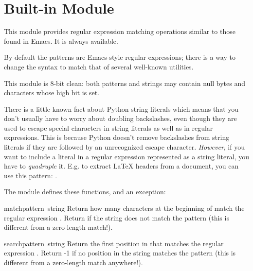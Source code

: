 \section{Built-in Module }

This module provides regular expression matching operations similar to
those found in Emacs.  It is always available.

By default the patterns are Emacs-style regular expressions; there is
a way to change the syntax to match that of several well-known
\UNIX{} utilities.

This module is 8-bit clean: both patterns and strings may contain null
bytes and characters whose high bit is set.

 There is a little-known fact about Python string
literals which means that you don't usually have to worry about
doubling backslashes, even though they are used to escape special
characters in string literals as well as in regular expressions.  This
is because Python doesn't remove backslashes from string literals if
they are followed by an unrecognized escape character.
\emph{However}, if you want to include a literal  in a
regular expression represented as a string literal, you have to
\emph{quadruple} it.  E.g.  to extract LaTeX  headers from a document, you can use this pattern:
.

The module defines these functions, and an exception:

\renewcommand{\indexsubitem}{(in module regex)}

\begin{funcdesc}{match}{pattern\, string}
  Return how many characters at the beginning of  match
  the regular expression .  Return  if the
  string does not match the pattern (this is different from a
  zero-length match!).
\end{funcdesc}

\begin{funcdesc}{search}{pattern\, string}
  Return the first position in  that matches the regular
  expression .  Return -1 if no position in the string
  matches the pattern (this is different from a zero-length match
  anywhere!).
\end{funcdesc}

